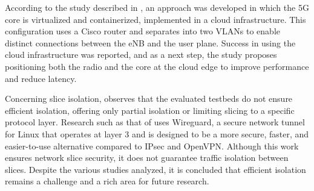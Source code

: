 According to the study described in \cite{Dzogovic2018}, an approach was developed in which the 5G core is virtualized and containerized, implemented in a cloud infrastructure. This configuration uses a Cisco router and separates into two VLANs to enable distinct connections between the eNB and the user plane. Success in using the cloud infrastructure was reported, and as a next step, the study proposes positioning both the radio and the core at the cloud edge to improve performance and reduce latency.

Concerning slice isolation, \cite{Esmaeily:2021} observes that the evaluated testbeds do not ensure efficient isolation, offering only partial isolation or limiting slicing to a specific protocol layer. Research such as that of \cite{Haga2020} uses Wireguard, a secure network tunnel for Linux that operates at layer 3 and is designed to be a more secure, faster, and easier-to-use alternative compared to IPsec and OpenVPN. Although this work ensures network slice security, it does not guarantee traffic isolation between slices. Despite the various studies analyzed, it is concluded that efficient isolation remains a challenge and a rich area for future research.